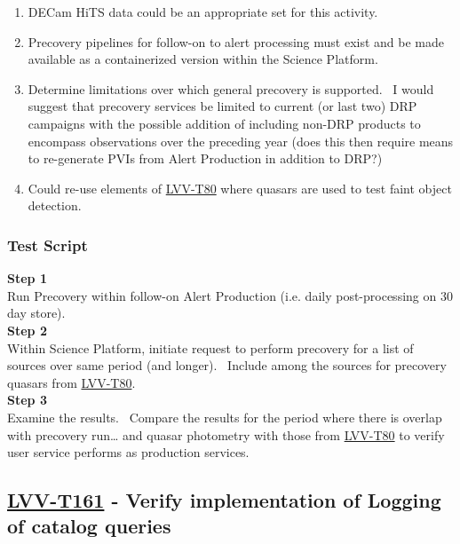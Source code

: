 \begin{enumerate}
\tightlist
\item
  DECam HiTS data could be an appropriate set for this activity.
\item
  Precovery pipelines for follow-on to alert processing must exist and
  be made available as a containerized version within the Science
  Platform.
\item
  Determine limitations over which general precovery is supported. ~I
  would suggest that precovery services be limited to current (or last
  two) DRP campaigns with the possible addition of including non-DRP
  products to encompass observations over the preceding year (does this
  then require means to re-generate PVIs from Alert Production in
  addition to DRP?)
\item
  Could re-use elements of
  \href{https://jira.lsstcorp.org/secure/Tests.jspa\#/testCase/LVV-T80}{LVV-T80}
  where quasars are used to test faint object detection.
\end{enumerate}

\subsubsection{Test Script}\label{test-script-27}

\textbf{Step 1}\\
Run Precovery within follow-on Alert Production (i.e. daily
post-processing on 30 day store).\\[2\baselineskip]\textbf{Step 2}\\
Within Science Platform, initiate request to perform precovery for a
list of sources over same period (and longer). ~Include among the
sources for precovery quasars from
\href{https://jira.lsstcorp.org/secure/Tests.jspa\#/testCase/LVV-T80}{LVV-T80}.~\\[2\baselineskip]\textbf{Step
3}\\
Examine the results. ~Compare the results for the period where there is
overlap with precovery run\ldots{} and quasar photometry with those from
\href{https://jira.lsstcorp.org/secure/Tests.jspa\#/testCase/LVV-T80}{LVV-T80}
to verify user service performs as production
services.\\[2\baselineskip]

\hypertarget{lvv-t161---verify-implementation-of-logging-of-catalog-queries}{\subsection{\texorpdfstring{\href{https://jira.lsstcorp.org/secure/Tests.jspa\#/testCase/LVV-T161}{LVV-T161}
- Verify implementation of Logging of catalog
queries}{LVV-T161 - Verify implementation of Logging of catalog queries}}\label{lvv-t161---verify-implementation-of-logging-of-catalog-queries}}

